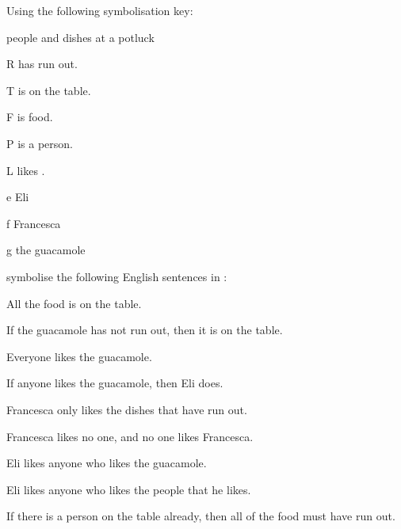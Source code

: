 \problempart
Using the following symbolisation key:
\begin{ekey}
\item[\text{domain}] people and dishes at a potluck
\item[R\meta{x}]  has run out.
\item[T\meta{x}]  is on the table.
\item[F\meta{x}]  is food.
\item[P\meta{x}]  is a person.
\item[L\meta{xy}]  likes .
\item[e] Eli
\item[f] Francesca
\item[g] the guacamole
\end{ekey}
symbolise the following English sentences in \FOL:
\begin{earg}
\item All the food is on the table.
\item If the guacamole has not run out, then it is on the table.
\item Everyone likes the guacamole.
\item If anyone likes the guacamole, then Eli does.
\item Francesca only likes the dishes that have run out.
\item Francesca likes no one, and no one likes Francesca.
\item Eli likes anyone who likes the guacamole.
\item Eli likes anyone who likes the people that he likes.
\item If there is a person on the table already, then all of the food must have run out.
\end{earg}


